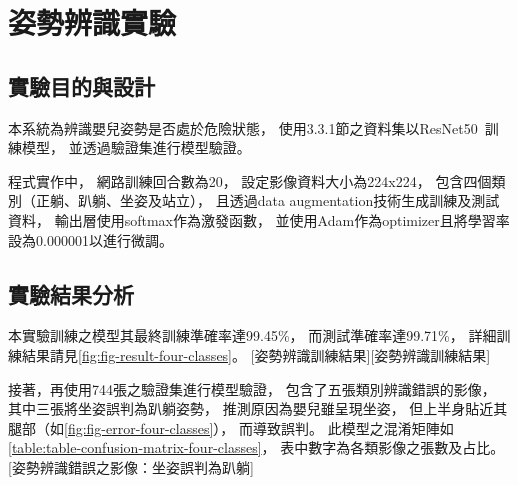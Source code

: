 \documentclass[class=NCU_thesis, crop=false]{standalone}
\begin{document}
\section{姿勢辨識實驗}
\subsection{實驗目的與設計}
本系統為辨識嬰兒姿勢是否處於危險狀態，
使用3.3.1節之資料集以ResNet50~\cite{he_deep_2016}訓練模型，
並透過驗證集進行模型驗證。

程式實作中，
網路訓練回合數為20，
設定影像資料大小為224x224，
包含四個類別（正躺、趴躺、坐姿及站立），
且透過data augmentation技術生成訓練及測試資料，
輸出層使用softmax作為激發函數，
並使用Adam作為optimizer且將學習率設為0.000001以進行微調。

\subsection{實驗結果分析}
本實驗訓練之模型其最終訓練準確率達99.45\%，
而測試準確率達99.71\%，
詳細訓練結果請見\cref{fig:fig-result-four-classes}。
[姿勢辨識訓練結果][姿勢辨識訓練結果]

接著，再使用744張之驗證集進行模型驗證，
包含了五張類別辨識錯誤的影像，
其中三張將坐姿誤判為趴躺姿勢，
推測原因為嬰兒雖呈現坐姿，
但上半身貼近其腿部（如\cref{fig:fig-error-four-classes}），
而導致誤判。
此模型之混淆矩陣如\cref{table:table-confusion-matrix-four-classes}，
表中數字為各類影像之張數及占比。
[姿勢辨識錯誤之影像：坐姿誤判為趴躺]
\end{document}

